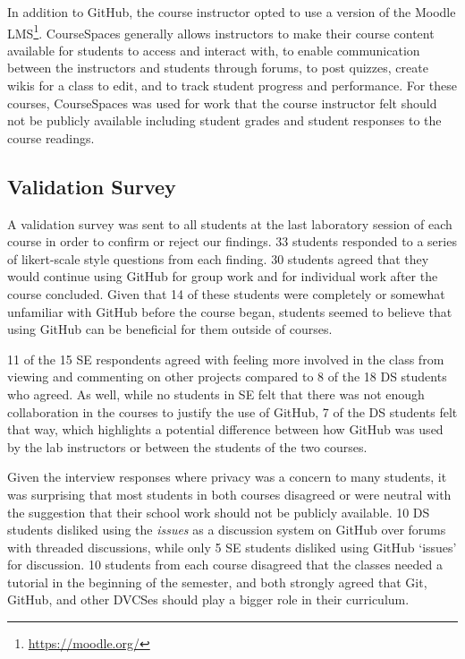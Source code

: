 In addition to GitHub, the course instructor opted to use a version of the Moodle LMS\footnote{\url{https://moodle.org/}}. CourseSpaces generally allows instructors to make their course content available for students to access and interact with, to enable communication between the instructors and students through forums, to post quizzes, create wikis for a class to edit, and to track student progress and performance. For these courses, CourseSpaces was used for work that the course instructor felt should not be publicly available including student grades and student responses to the course readings.

\subsection{Validation Survey}

A validation survey was sent to all students at the last laboratory session of each course in order to confirm or reject our findings. 33 students responded to a series of likert-scale style questions from each finding. 30 students agreed that they would continue using GitHub for group work and for individual work after the course concluded. Given that 14 of these students were completely or somewhat unfamiliar with GitHub before the course began, students seemed to believe that using GitHub can be beneficial for them outside of courses.

11 of the 15 SE respondents agreed with feeling more involved in the class from viewing and commenting on other projects compared to 8 of the 18 DS students who agreed. As well, while no students in SE felt that there was not enough collaboration in the courses to justify the use of GitHub, 7 of the DS students felt that way, which highlights a potential difference between how GitHub was used by the lab instructors or between the students of the two courses. %

Given the interview responses where privacy was a concern to many students, it was surprising that most students in both courses disagreed or were neutral with the suggestion that their school work should not be publicly available. 10 DS students disliked using the \emph{issues} as a discussion system on GitHub over forums with threaded discussions, while only 5 SE students disliked using GitHub `issues' for discussion. 10 students from each course disagreed that the classes needed a tutorial in the beginning of the semester, and both strongly agreed that Git, GitHub, and other DVCSes should play a bigger role in their curriculum.

